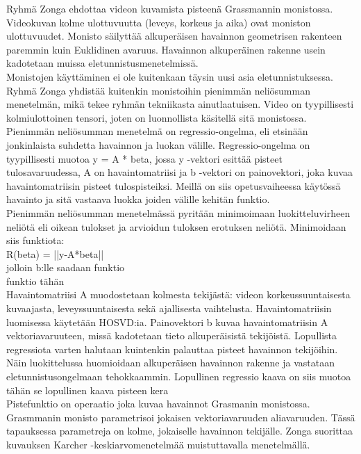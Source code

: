 Ryhmä Zonga ehdottaa videon kuvamista pisteenä Grassmannin monistossa. Videokuvan kolme ulottuvuutta (leveys, korkeus ja aika) ovat moniston ulottuvuudet.
Monisto säilyttää alkuperäisen havainnon geometrisen rakenteen paremmin kuin Euklidinen avaruus.
Havainnon alkuperäinen rakenne usein kadotetaan muissa eletunnistusmenetelmissä. \\

Monistojen käyttäminen ei ole kuitenkaan täysin uusi asia eletunnistuksessa.
Ryhmä Zonga yhdistää kuitenkin monistoihin pienimmän neliösumman menetelmän, mikä tekee ryhmän tekniikasta ainutlaatuisen. 
Video on tyypillisesti kolmiulottoinen tensori, joten on luonnollista käsitellä sitä monistossa.
Pienimmän neliösumman menetelmä on regressio-ongelma, eli etsinään jonkinlaista suhdetta havainnon ja luokan välille.
Regressio-ongelma on tyypillisesti muotoa y = A * beta, jossa y -vektori esittää pisteet tulosavaruudessa, A on havaintomatriisi 
ja b -vektori on painovektori, joka kuvaa havaintomatriisin pisteet tulospisteiksi.
Meillä on siis opetusvaiheessa käytössä havainto ja sitä vastaava luokka joiden välille kehitän funktio.\\

Pienimmän neliösumman menetelmässä pyritään minimoimaan luokitteluvirheen neliötä eli oikean tulokset ja arvioidun tuloksen erotuksen neliötä.
Minimoidaan siis funktiota: \\
R(beta) = ||y-A*beta|| \\
jolloin b:lle saadaan funktio\\
funktio tähän\\

Havaintomatriisi A muodostetaan kolmesta tekijästä: videon korkeussuuntaisesta kuvaajasta, leveyssuuntaisesta sekä ajallisesta vaihtelusta.
Havaintomatriisin luomisessa käytetään HOSVD:ia. Painovektori b kuvaa havaintomatriisin A vektoriavaruuteen, missä kadotetaan tieto alkuperäisistä tekijöistä. 
Lopullista regressiota varten halutaan kuintenkin palauttaa pisteet havainnon tekijöihin.
Näin luokittelussa huomioidaan alkuperäisen havainnon rakenne ja vastataan eletunnistusongelmaan tehokkaammin. 
Lopullinen regressio kaava on siis muotoa\\
tähän se lopullinen kaava pisteen kera\\
Pistefunktio on operaatio joka kuvaa havainnot Grasmanin monistossa. Grasmmanin monisto parametrisoi jokaisen vektoriavaruuden aliavaruuden.
Tässä tapauksessa parametreja on kolme, jokaiselle havainnon tekijälle.
Zonga suorittaa kuvauksen Karcher -keskiarvomenetelmää muistuttavalla menetelmällä.\\

